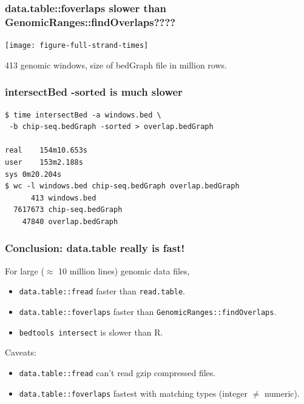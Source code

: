 \documentclass{beamer}
\begin{document}
\begin{frame}
  \frametitle{data.table::foverlaps slower than
    GenomicRanges::findOverlaps????}
  \texttt{[image: figure-full-strand-times]}

  413 genomic windows, size of bedGraph file in million rows.

\end{frame}

\begin{frame}[fragile]
  \frametitle{intersectBed -sorted is much slower}

\begin{verbatim}
$ time intersectBed -a windows.bed \
 -b chip-seq.bedGraph -sorted > overlap.bedGraph

real	154m10.653s
user	153m2.188s
sys	0m20.204s
$ wc -l windows.bed chip-seq.bedGraph overlap.bedGraph 
      413 windows.bed
  7617673 chip-seq.bedGraph
    47840 overlap.bedGraph
\end{verbatim}


  
\end{frame}

\begin{frame}
  \frametitle{Conclusion: data.table really is fast!}
  For large ($\approx$ 10 million lines) genomic data files,
  \begin{itemize}
  \item \texttt{data.table::fread} faster than \texttt{read.table}.
  \item \texttt{data.table::foverlaps} faster than
    \texttt{GenomicRanges::findOverlaps}.
  \item \texttt{bedtools intersect} is slower than R.
  \end{itemize}

  Caveats:
  \begin{itemize}
  \item \texttt{data.table::fread} can't read gzip compressed files.
  \item \texttt{data.table::foverlaps} fastest with matching types
    (integer $\neq$ numeric).
  \end{itemize}
\end{frame}
\end{document}
